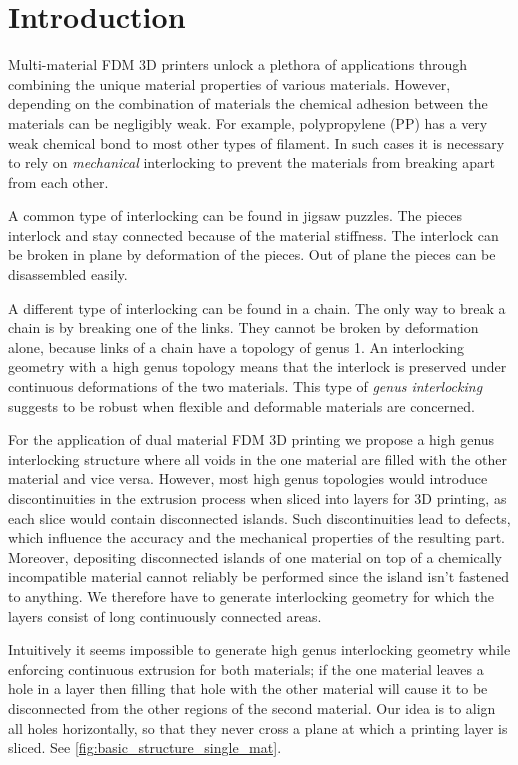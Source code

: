 \section{Introduction}
Multi-material FDM 3D printers unlock a plethora of applications through combining the unique material properties of various materials.
However, depending on the combination of materials the chemical adhesion between the materials can be negligibly weak.
For example, polypropylene (PP) has a very weak chemical bond to most other types of filament.
In such cases it is necessary to rely on \emph{mechanical} interlocking to prevent the materials from breaking apart from each other.

A common type of interlocking can be found in jigsaw puzzles.
The pieces interlock and stay connected because of the material stiffness.
The interlock can be broken in plane by deformation of the pieces.
Out of plane the pieces can be disassembled easily.

A different type of interlocking can be found in a chain.
The only way to break a chain is by breaking one of the links.
They cannot be broken by deformation alone, because links of a chain have a topology of genus 1.
An interlocking geometry with a high genus topology means that the interlock is preserved under continuous deformations of the two materials.
This type of \emph{genus interlocking} suggests to be robust when flexible and deformable materials are concerned.

For the application of dual material FDM 3D printing we propose a high genus interlocking structure where all voids in the one material are filled with the other material and vice versa.
However, most high genus topologies would introduce discontinuities in the extrusion process when sliced into layers for 3D printing, as each slice would contain disconnected islands.
Such discontinuities lead to defects, which influence the accuracy and the mechanical properties of the resulting part.
Moreover, depositing disconnected islands of one material on top of a chemically incompatible material cannot reliably be performed since the island isn't fastened to anything.
We therefore have to generate interlocking geometry for which the layers consist of long continuously connected areas.

Intuitively it seems impossible to generate high genus interlocking geometry while enforcing continuous extrusion for both materials;
if the one material leaves a hole in a layer then filling that hole with the other material will cause it to be disconnected from the other regions of the second material.
Our idea is to align all holes horizontally, so that they never cross a plane at which a printing layer is sliced.
See \cref{fig:basic_structure_single_mat}.


